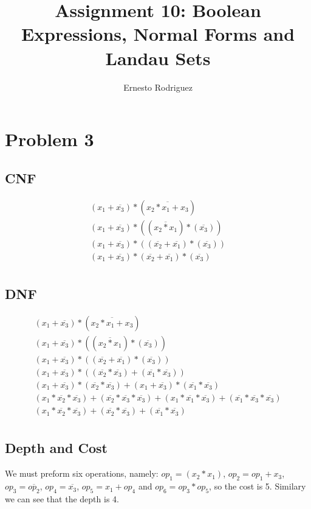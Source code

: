 \documentclass[11pt]{article}
\author{Ernesto Rodriguez}
\title{Assignment 10: Boolean Expressions, Normal Forms and Landau Sets}
\begin{document}
\maketitle

\section{Problem 3}

\subsection{CNF}
\[
\begin{array}{ll}
  (x_1+\overline{x_3})*(\overline{x_2*x_1+x_3}) \\
  (x_1+\overline{x_3})*((\overline{x_2*x_1})*(\overline{x_3})) \\
  (x_1+\overline{x_3})*((\overline{x_2}+\overline{x_1})*(\overline{x_3})) \\
  (x_1+\overline{x_3})*(\overline{x_2}+\overline{x_1})*(\overline{x_3}) \\
\end{array}
\]

\subsection{DNF}
\[
\begin{array}{ll}
  (x_1+\overline{x_3})*(\overline{x_2*x_1+x_3}) \\
  (x_1+\overline{x_3})*((\overline{x_2*x_1})*(\overline{x_3})) \\
  (x_1+\overline{x_3})*((\overline{x_2}+\overline{x_1})*(\overline{x_3})) \\
  (x_1+\overline{x_3})*((\overline{x_2}*\overline{x_3})+(\overline{x_1}*\overline{x_3}))\\
  (x_1+\overline{x_3})*(\overline{x_2}*\overline{x_3})+(x_1+\overline{x_3})*(\overline{x_1}*\overline{x_3}) \\
  (x_1*\overline{x_2}*\overline{x_3})+(\overline{x_2}*\overline{x_3}*\overline{x_3})+(x_1*\overline{x_1}*\overline{x_3})+(\overline{x_1}*\overline{x_3}*\overline{x_3})\\
  (x_1*\overline{x_2}*\overline{x_3})+(\overline{x_2}*\overline{x_3})+(\overline{x_1}*\overline{x_3})\\
\end{array}
\]

\subsection{Depth and Cost}

We must preform six operations, namely: $op_1=(x_2*x_1)$, $op_2=op_1+x_3$, $op_3=\overline{op_2}$, $op_4=\overline{x_3}$, $op_5=x_1+op_4$ and $op_6=op_3*op_5$, so the cost is 5. Similary we can see that the depth is 4.
\end{document}
